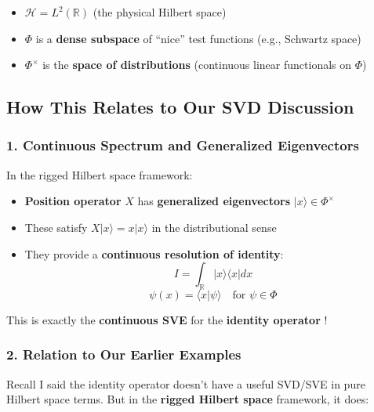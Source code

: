 \documentclass[aps,prl,reprint]{revtex4-2}
\begin{document}
\begin{itemize}
\item $\mathcal{H} = L^2(\mathbb{R})$ (the physical Hilbert space)

\item $\Phi$ is a \textbf{dense subspace} of ``nice'' test functions (e.g.,
Schwartz space)

\item $\Phi^\times$ is the \textbf{space of distributions} (continuous
linear functionals on $\Phi$)
\end{itemize}

\subsection*{How This Relates to Our SVD Discussion}

\subsubsection*{1. Continuous Spectrum and Generalized Eigenvectors}

In the rigged Hilbert space framework:

\begin{itemize}
\item \textbf{Position operator} $X$ has \textbf{generalized eigenvectors} $%
|x\rangle \in \Phi^\times$

\item These satisfy $X|x\rangle = x|x\rangle$ in the distributional sense

\item They provide a \textbf{continuous resolution of identity}:  
\begin{equation*}
I = \int_{\mathbb{R}} |x\rangle\langle x| dx  
\end{equation*}
\begin{equation*}
\psi(x) = \langle x|\psi\rangle \quad \text{for } \psi \in \Phi  
\end{equation*}
\end{itemize}

This is exactly the \textbf{continuous SVE} for the \textbf{identity operator%
}!

\subsubsection*{2. Relation to Our Earlier Examples}

Recall I said the identity operator doesn't have a useful SVD/SVE in pure
Hilbert space terms. But in the \textbf{rigged Hilbert space} framework, it
does:
\end{document}
